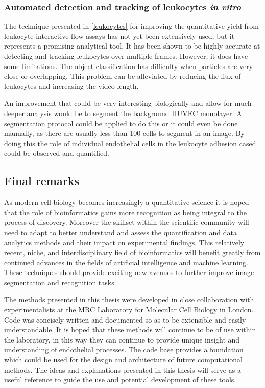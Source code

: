 \subsubsection{Automated detection and tracking of leukocytes \emph{in vitro}}
The technique presented in \autoref{leukocytes} for improving the quantitative yield from leukocyte interactive flow assays has not yet been extensively used, but it represents a promising analytical tool. It has been shown to be highly accurate at detecting and tracking leukocytes over multiple frames. However, it does have some limitations. The object classification has difficulty when particles are very close or overlapping. This problem can be alleviated by reducing the flux of leukocytes and increasing the video length.

An improvement that could be very interesting biologically and allow for much deeper analysis would be to segment the background HUVEC monolayer. A segmentation protocol could be applied to do this or it could even be done manually, as there are usually less than 100 cells to segment in an image. By doing this the role of individual endothelial cells in the leukocyte adhesion cased could be observed and quantified.

\subsection*{Final remarks}
As modern cell biology becomes increasingly a quantitative science it is hoped that the role of bioinformatics gains more recognition as being integral to the process of discovery. Moreover the skillset within the scientific community will need to adapt to better understand and assess the quantification and data analytics methods and their impact on experimental findings. This relatively recent, niche, and interdisciplinary field of bioinformatics will benefit greatly from continued advances in the fields of artificial intelligence and machine learning. These techniques should provide exciting new avenues to further improve image segmentation and recognition tasks.

The methods presented in this thesis were developed in close collaboration with experimentalists at the MRC Laboratory for Molecular Cell Biology in London. Code was concisely written and documented so as to be extensible and easily understandable. It is hoped that these methods will continue to be of use within the laboratory, in this way they can continue to provide unique insight and understanding of endothelial processes. The code base provides a foundation which could be used for the design and architecture of future computational methods. The ideas and explanations presented in this thesis will serve as a useful reference to guide the use and potential development of these tools.
